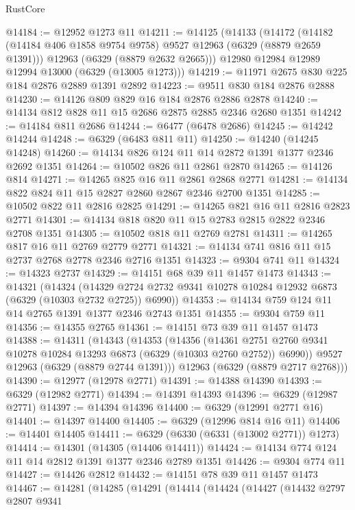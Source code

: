 \begin{lexlean}{RustCore}
\begin{coremodule}
@14184 := @12952 @1273 @11
@14211 := @14125
    (@14133
      (@14172
        (@14182 (@14184 @406 @1858 @9754 @9758) @9527 @12963 (@6329 (@8879 @2659 @1391)))
        @12963
        (@6329 (@8879 @2632 @2665)))
      @12980
      @12984
      @12989
      @12994
      @13000
      (@6329 (@13005 @1273)))
@14219 := @11971 @2675 @830 @225 @184 @2876 @2889 @1391 @2892
@14223 := @9511 @830 @184 @2876 @2888
@14230 := @14126 @809 @829 @16 @184 @2876 @2886 @2878
@14240 := @14134 @812 @828 @11 @15 @2686 @2875 @2885 @2346 @2680 @1351
@14242 := @14184 @811 @2686
@14244 := @6477 (@6478 @2686)
@14245 := @14242 @14244
@14248 := @6329 (@6483 @811 @11)
@14250 := @14240 (@14245 @14248)
@14260 := @14134 @826 @124 @11 @14 @2872 @1391 @1377 @2346 @2692 @1351
@14264 := @10502 @826 @11 @2861 @2870
@14265 := @14126 @814
@14271 := @14265 @825 @16 @11 @2861 @2868 @2771
@14281 := @14134 @822 @824 @11 @15 @2827 @2860 @2867 @2346 @2700 @1351
@14285 := @10502 @822 @11 @2816 @2825
@14291 := @14265 @821 @16 @11 @2816 @2823 @2771
@14301 := @14134 @818 @820 @11 @15 @2783 @2815 @2822 @2346 @2708 @1351
@14305 := @10502 @818 @11 @2769 @2781
@14311 := @14265 @817 @16 @11 @2769 @2779 @2771
@14321 := @14134 @741 @816 @11 @15 @2737 @2768 @2778 @2346 @2716 @1351
@14323 := @9304 @741 @11
@14324 := @14323 @2737
@14329 := @14151 @68 @39 @11 @1457 @1473
@14343 := @14321
    (@14324
      (@14329 @2724 @2732 @9341 @10278 @10284 @12932 @6873 (@6329 (@10303 @2732 @2725)) @6990))
@14353 := @14134 @759 @124 @11 @14 @2765 @1391 @1377 @2346 @2743 @1351
@14355 := @9304 @759 @11
@14356 := @14355 @2765
@14361 := @14151 @73 @39 @11 @1457 @1473
@14388 := @14311
    (@14343
      (@14353
        (@14356
          (@14361 @2751 @2760 @9341 @10278 @10284 @13293 @6873 (@6329 (@10303 @2760 @2752)) @6990))
        @9527
        @12963
        (@6329 (@8879 @2744 @1391)))
      @12963
      (@6329 (@8879 @2717 @2768)))
@14390 := @12977 (@12978 @2771)
@14391 := @14388 @14390
@14393 := @6329 (@12982 @2771)
@14394 := @14391 @14393
@14396 := @6329 (@12987 @2771)
@14397 := @14394 @14396
@14400 := @6329 (@12991 @2771 @16)
@14401 := @14397 @14400
@14405 := @6329 (@12996 @814 @16 @11)
@14406 := @14401 @14405
@14411 := @6329 (@6330 (@6331 (@13002 @2771)) @1273)
@14414 := @14301 (@14305 (@14406 @14411))
@14424 := @14134 @774 @124 @11 @14 @2812 @1391 @1377 @2346 @2789 @1351
@14426 := @9304 @774 @11
@14427 := @14426 @2812
@14432 := @14151 @78 @39 @11 @1457 @1473
@14467 := @14281
    (@14285
      (@14291
        (@14414
          (@14424
            (@14427
              (@14432
                @2797
                @2807
                @9341

\end{coremodule}
\end{lexlean}
